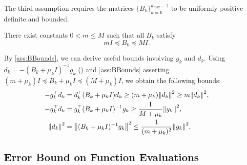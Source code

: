 \documentclass[journal_revised_MPC]{subfiles}
\begin{document}
The third assumption requires the matrices $\{B_k\}_{k=0}^{k_{\mathrm{max}}-1}$ to be uniformly positive definite and bounded.
\begin{assumption}\label{ass:BBounds}
    There exist constants $0 < m \leq M$ such that all $B_k$ satisfy
    \begin{equation*}
        mI \preceq B_k \preceq MI.
    \end{equation*}
\end{assumption}
By \cref{ass:BBounds}, we can derive useful bounds involving $g_k$ and $d_k$.
Using $d_k=-(B_k+\mu_k I)^{-1} g_k$ () and \cref{ass:BBounds} asserting $(m + \mu_k)I \preceq B_k + \mu_k I \preceq (M + \mu_k)I$, we obtain the following bounds:
\begin{align}
    -g_k^\top d_k & = d_k^\top (B_k+\mu_k I) d_k      \ge (m+\mu_k)\norm{d_k}^2 \ge m \norm{d_k}^2, \label{eq:BBounds_results_zero} \\
    -g_k^\top d_k & = g_k^\top (B_k+\mu_k I)^{-1} g_k \ge \frac{1}{M+\mu_k}\norm{g_k}^2, \label{eq:BBounds_results_first}           \\
    \norm{d_k}^2  & = \norm{(B_k+\mu_k I)^{-1}g_k}^2 \le \frac{1}{(m+\mu_k)^2}\norm{g_k}^2. \label{eq:BBounds_results_second}
\end{align}

\subsection{Error Bound on Function Evaluations}\label{sec:error_bound_on_function_evaluations}
\end{document}
